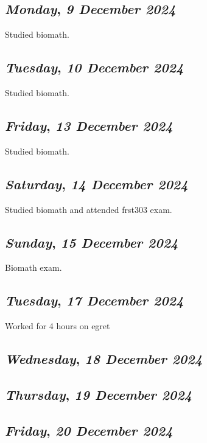 \def\day{\textit{9 December 2024}}
\def\weekday{\textit{Monday}}
\subsection*{\weekday, \day}
Studied biomath.

\def\day{\textit{10 December 2024}}
\def\weekday{\textit{Tuesday}}
\subsection*{\weekday, \day}
Studied biomath.

\def\day{\textit{13 December 2024}}
\def\weekday{\textit{Friday}}
\subsection*{\weekday, \day}
Studied biomath.
\def\day{\textit{14 December 2024}}
\def\weekday{\textit{Saturday}}
\subsection*{\weekday, \day}
Studied biomath and attended frst303 exam.

\def\day{\textit{15 December 2024}}
\def\weekday{\textit{Sunday}}
\subsection*{\weekday, \day}
Biomath exam.

\def\day{\textit{17 December 2024}}
\def\weekday{\textit{Tuesday}}
\subsection*{\weekday, \day}
Worked for 4 hours on egret 

\def\day{\textit{18 December 2024}}
\def\weekday{\textit{Wednesday}}
\subsection*{\weekday, \day}

\def\day{\textit{19 December 2024}}
\def\weekday{\textit{Thursday}}
\subsection*{\weekday, \day}

\def\day{\textit{20 December 2024}}
\def\weekday{\textit{Friday}}
\subsection*{\weekday, \day}

